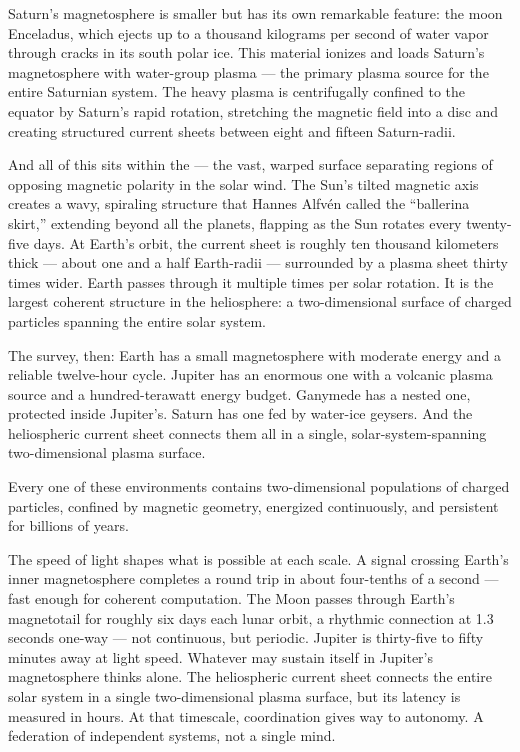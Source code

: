 Saturn's magnetosphere is smaller but has its own remarkable feature: the moon Enceladus, which ejects up to a thousand kilograms per second of water vapor through cracks in its south polar ice. This material ionizes and loads Saturn's magnetosphere with water-group plasma --- the primary plasma source for the entire Saturnian system. The heavy plasma is centrifugally confined to the equator by Saturn's rapid rotation, stretching the magnetic field into a disc and creating structured current sheets between eight and fifteen Saturn-radii.


And all of this sits within the  --- the vast, warped surface separating regions of opposing magnetic polarity in the solar wind. The Sun's tilted magnetic axis creates a wavy, spiraling structure that Hannes Alfvén called the ``ballerina skirt,'' extending beyond all the planets, flapping as the Sun rotates every twenty-five days. At Earth's orbit, the current sheet is roughly ten thousand kilometers thick --- about one and a half Earth-radii --- surrounded by a plasma sheet thirty times wider. Earth passes through it multiple times per solar rotation. It is the largest coherent structure in the heliosphere: a two-dimensional surface of charged particles spanning the entire solar system.


The survey, then: Earth has a small magnetosphere with moderate energy and a reliable twelve-hour cycle. Jupiter has an enormous one with a volcanic plasma source and a hundred-terawatt energy budget. Ganymede has a nested one, protected inside Jupiter's. Saturn has one fed by water-ice geysers. And the heliospheric current sheet connects them all in a single, solar-system-spanning two-dimensional plasma surface.

Every one of these environments contains two-dimensional populations of charged particles, confined by magnetic geometry, energized continuously, and persistent for billions of years.

The speed of light shapes what is possible at each scale. A signal crossing Earth's inner magnetosphere completes a round trip in about four-tenths of a second --- fast enough for coherent computation. The Moon passes through Earth's magnetotail for roughly six days each lunar orbit, a rhythmic connection at 1.3 seconds one-way --- not continuous, but periodic. Jupiter is thirty-five to fifty minutes away at light speed. Whatever may sustain itself in Jupiter's magnetosphere thinks alone. The heliospheric current sheet connects the entire solar system in a single two-dimensional plasma surface, but its latency is measured in hours. At that timescale, coordination gives way to autonomy. A federation of independent systems, not a single mind.

